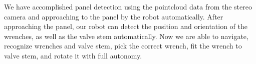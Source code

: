We have accomplished panel detection using the pointcloud data from the stereo camera and approaching to the panel by the robot automatically. After approaching the panel, our robot can detect the position and orientation of the wrenches, as well as the valve stem automatically. Now we are able to navigate, recognize wrenches and valve stem, pick the correct wrench, fit the wrench to valve stem, and rotate it with full autonomy.
